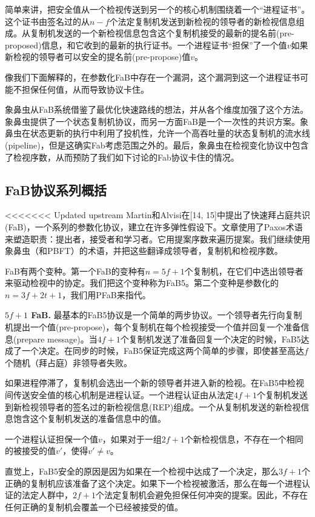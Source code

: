 \documentclass[UTF8]{ctexart}
\begin{document}
简单来讲，把安全值从一个检视传送到另一个的核心机制围绕着一个“进程证书”。这个证书由签名过的从$n - f$个法定复制机发送到新检视的领导者的新检视信息组成。从复制机发送的一个新检视信息包含这个复制机接受的最新的提名前(pre-proposed)信息，和它收到的最新的执行证书。一个进程证书“担保”了一个值$v$如果新检视的领导者可以安全的提名前(pre-propose)值$v$。

像我们下面解释的，在参数化FaB中存在一个漏洞，这个漏洞到这一个进程证书可能不担保任何值，从而导致协议卡住。

象鼻虫从FaB系统借鉴了最优化快速路线的想法，并从各个维度加强了这个方法。象鼻虫提供了一个状态复制机协议，而另一方面FaB是一个一次性的共识方案。象鼻虫在状态更新的执行中利用了投机性，允许一个高吞吐量的状态复制机的流水线(pipeline)，但是这确实Fab考虑范围之外的。最后，象鼻虫在检视变化协议中包含了检视序数，从而预防了我们如下讨论的Fab协议卡住的情况。

\subsection{FaB协议系列概括}
<<<<<<< Updated upstream
Martin和Alvisi在[14, 15]中提出了快速拜占庭共识(FaB)，一个系列的参数化协议，建立在许多弹性假设下。文章使用了Paxos术语来塑造职责：提出者，接受者和学习者。它用提案序数来遍历提案。我们继续使用象鼻虫（和PBFT）的术语，并把这些翻译成领导者，复制机和检视序数。

FaB有两个变种。第一个FaB的变种有$n = 5f + 1$个复制机，在它们中选出领导者来驱动检视中的协定。我们把这个变种称为FaB5。第二个变种是参数化的$n = 3f + 2t + 1$，我们用PFaB来指代。

\textbf{$5f + 1$ FaB.} \hspace{3mm} 最基本的FaB5协议是一个简单的两步协议。一个领导者先行向复制机提出一个值(pre-propose)，每个复制机在每个检视接受一个值并回复一个准备信息(prepare message)。当$4f + 1$个复制机发送了准备回复一个决定的时候，FaB5达成了一个决定。在同步的时候，FaB5保证完成这两个简单的步骤，即使甚至高达$f$个随机（拜占庭）非领导者失败。

如果进程停滞了，复制机会选出一个新的领导者并进入新的检视。在FaB5中检视间传送安全值的核心机制是进程认证。一个进程认证由从法定$4f + 1$个复制机发送到新检视领导者的签名过的新检视信息(REP)组成。一个从复制机发送的新检视信息饱含这个复制机发送的准备信息中的值。

一个进程认证担保一个值$v$，如果对于一组$2f + 1$个新检视信息，不存在一个相同的被接受的值$v'$，使得$v' \neq v$。

直觉上，FaB5安全的原因是因为如果在一个检视中达成了一个决定，那么$3f + 1$个正确的复制机应该准备了这个决定。如果下一个检视被激活，那么在每一个进程认证的法定人群中，$2f + 1$个法定复制机会避免担保任何冲突的提案。因此，不存在任何正确的复制机会覆盖一个已经被接受的值。
\end{document}
